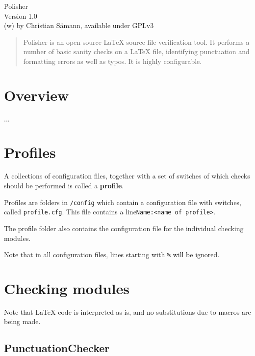 \documentclass[11pt]{article}
\begin{document}
    \begin{center}
        {\Huge Polisher\\[0.5cm] Version 1.0}\\[0.5cm]
        {\large(w) by Christian S{\"a}mann, available under GPLv3} \vskip 2cm
    \end{center}
    \vspace*{5cm}
    \begin{quote}\large
        Polisher is an open source LaTeX source file verification tool. It performs a number of basic sanity checks on a LaTeX file, identifying punctuation and formatting errors as well as typos. It is highly configurable.
    \end{quote}
    
    
    \newpage
    
    \tableofcontents
    
    \newpage
    
    \section{Overview}
    
    ...
    
    \section{Profiles}
    
    A collections of configuration files, together with a set of switches of which checks should be performed is called a {\bf profile}.
    
    Profiles are folders in \verb+/config+ which contain a configuration file with switches, called \verb+profile.cfg+. This file contains a line\verb+Name:<name of profile>+. 
    
    The profile folder also contains the configuration file for the individual checking modules.
    
    Note that in all configuration files, lines starting with \verb+%+ will be ignored.
    
    \section{Checking modules}
    
    Note that LaTeX code is interpreted as is, and no substitutions due to macros are being made.
    
    \subsection{PunctuationChecker}
    
\end{document}
